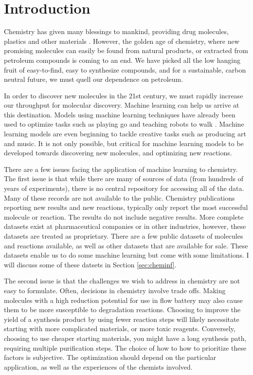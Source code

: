 \chapter{Introduction}
\thispagestyle{plain}

Chemistry has given many blessings to mankind, providing drug molecules, plastics and other materials \cite{napoleons_buttons}. However, the golden age of chemistry, where new promising molecules can easily be found from natural products, or extracted from petroleum compounds is coming to an end. We have picked all the low hanging fruit of easy-to-find, easy to synthesize compounds, and for a sustainable, carbon neutral future, we must quell our dependence on petroleum.

In order to discover new molecules in the 21st century, we must rapidly increase our throughput for molecular discovery. Machine learning can help us arrive at this destination. Models using machine learning techniques have already been used to optimize tasks such as playing go and teaching robots to walk \cite{silver2016mastering,2017walkPavlov}. Machine learning models are even beginning to tackle creative tasks such as producing art and music. It is not only possible, but critical for machine learning models to be developed towards discovering new molecules, and optimizing new reactions.

There are a few issues facing the application of machine learning to chemistry. The first issue is that while there are many of sources of data (from hundreds of years of experiments), there is no central repository for accessing all of the data. Many of these records are not available to the public. Chemistry publications reporting new results and new reactions, typically only report the most successful molecule or reaction. The results do not include negative results. More complete datasets exist at pharmaceutical companies or in other industries, however, these datasets are treated as  proprietary. There are a few public datasets of molecules and reactions available, as well as other datasets that are available for sale. These datasets enable us to do some machine learning but come with some limitations. I will discuss some of these datsets in Section \ref{sec:cheminf}.

The second issue is that the challenges we wish to address in chemistry are not easy to formulate. Often, decisions in chemistry involve trade offs. Making molecules with a high reduction potential for use in flow battery may also cause them to be more susceptible to degradation reactions\cite{tabor_2018}. Choosing to improve the yield of a synthesis product by using fewer reaction steps will likely necessitate starting with more complicated materials, or more toxic reagents. Conversely, choosing to use cheaper starting materials, you might have a long synthesis path, requiring multiple purification steps. The choice of how to how to prioritize these factors is subjective. The optimization should depend on the particular application, as well as the experiences of the chemists involved.

